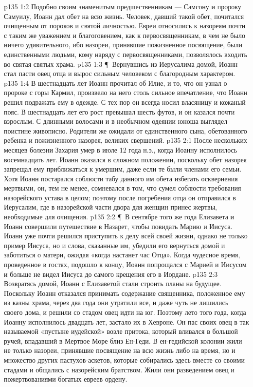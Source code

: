 \vs p135 1:2 Подобно своим знаменитым предшественникам --- Самсону и пророку Самуилу, Иоанн дал обет на всю жизнь. Человек, давший такой обет, почитался очищенным от пороков и святой личностью. Евреи относились к назореям почти с таким же уважением и благоговением, как к первосвященникам, в чем не было ничего удивительного, ибо назореи, принявшие пожизненное посвящение, были единственными людьми, кому наряду с первосвященниками, позволялось входить во святая святых храма.
\vs p135 1:3 \P\ Вернувшись из Иерусалима домой, Иоанн стал пасти овец отца и вырос сильным человеком с благородным характером.
\vs p135 1:4 В шестнадцать лет Иоанн прочитал об Илие, и то, что он узнал о пророке с горы Кармил, произвело на него столь сильное впечатление, что Иоанн решил подражать ему в одежде. С тех пор он всегда носил власяницу и кожаный пояс. В шестнадцать лет его рост превышал шесть футов, и он казался почти взрослым. С длинными волосами и в необычном одеянии юноша выглядел поистине живописно. Родители же ожидали от единственного сына, обетованного ребенка и пожизненного назорея, великих свершений.
\vs p135 2:1 После нескольких месяцев болезни Захария умер в июле 12 года н.э., когда Иоанну исполнилось восемнадцать лет. Иоанн оказался в сложном положении, поскольку обет назорея запрещал ему приближаться к умершим, даже если те были членами его семьи. Хотя Иоанн постарался соблюсти табу данного им обета избегать осквернения мертвыми, он, тем не менее, сомневался в том, что сумел соблюсти требования назорейского устава в целом; поэтому после погребения отца он отправился в Иерусалим, где в назорейской части двора для женщин принес жертвы, необходимые для очищения.
\vs p135 2:2 \P\ В сентябре того же года Елизавета и Иоанн совершили путешествие в Назарет, чтобы повидать Марию и Иисуса. Иоанн уже почти решился приступить к делу всей своей жизни, однако не только пример Иисуса, но и слова, сказанные им, убедили его вернуться домой и заботиться о матери, ожидая «когда настанет час Отца». Когда чудесное время, проведенное в гостях, подошло к концу, Иоанн попрощался с Марией и Иисусом и больше не видел Иисуса до самого крещения его в Иордане.
\vs p135 2:3 Возвратясь домой, Иоанн с Елизаветой стали строить планы на будущее. Поскольку Иоанн отказался принимать содержание священника, положенное ему из казны храма, через два года они утратили все, и даже чуть не лишились своего дома, и решили со стадом овец идти на юг. Поэтому лето того года, когда Иоанну исполнилось двадцать лет, застало их в Хевроне. Он пас своих овец в так называемой «пустыне иудейской» возле притока, который вливался в большой ручей, впадавший в Мертвое Море близ Ен\hyp{}Геди. В ен\hyp{}гедийской колонии жили не только назореи, принявшие посвящение на всю жизнь либо на время, но и множество других пастухов\hyp{}аскетов, которые собирались здесь вместе со своими стадами и общались с назорейским братством. Жили они разведением овец и пожертвованиями богатых евреев ордену.
